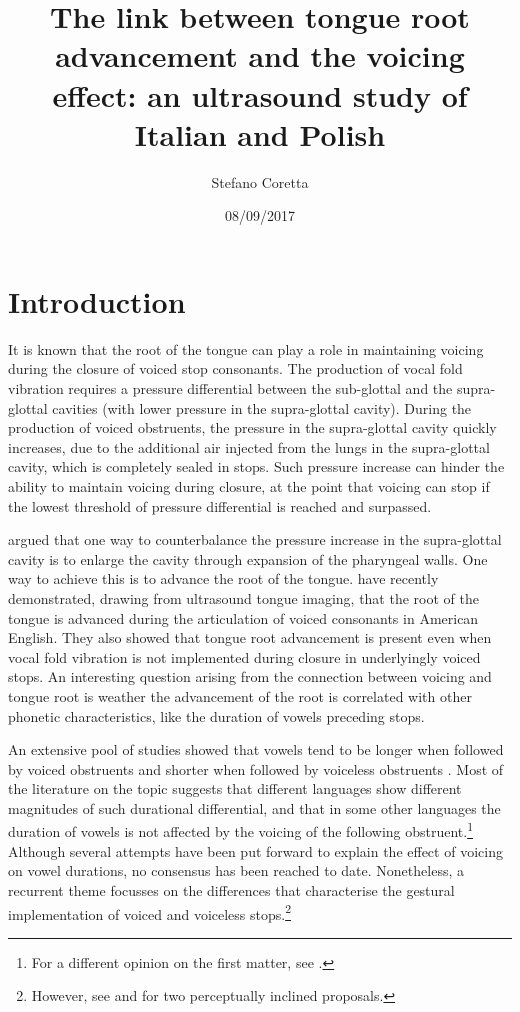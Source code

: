 \documentclass[authoryear, twocolumn]{elsarticle}
\title{The link between tongue root advancement and the voicing effect: an
ultrasound study of Italian and Polish}
\author{Stefano Coretta}
\date{08/09/2017}
\begin{document}
\maketitle

\section{Introduction}\label{introduction}

It is known that the root of the tongue can play a role in maintaining
voicing during the closure of voiced stop consonants. The production of
vocal fold vibration requires a pressure differential between the
sub-glottal and the supra-glottal cavities (with lower pressure in the
supra-glottal cavity). During the production of voiced obstruents, the
pressure in the supra-glottal cavity quickly increases, due to the
additional air injected from the lungs in the supra-glottal cavity,
which is completely sealed in stops. Such pressure increase can hinder
the ability to maintain voicing during closure, at the point that
voicing can stop if the lowest threshold of pressure differential is
reached and surpassed.

\citet{westbury1983} argued that one way to counterbalance the pressure
increase in the supra-glottal cavity is to enlarge the cavity through
expansion of the pharyngeal walls. One way to achieve this is to advance
the root of the tongue. \citet{ahn2016} have recently demonstrated,
drawing from ultrasound tongue imaging, that the root of the tongue is
advanced during the articulation of voiced consonants in American
English. They also showed that tongue root advancement is present even
when vocal fold vibration is not implemented during closure in
underlyingly voiced stops. An interesting question arising from the
connection between voicing and tongue root is weather the advancement of
the root is correlated with other phonetic characteristics, like the
duration of vowels preceding stops.

An extensive pool of studies showed that vowels tend to be longer when
followed by voiced obstruents and shorter when followed by voiceless
obstruents \citep[just to mention a
few]{house1953, chen1970, klatt1973, lisker1973}. Most of the literature
on the topic suggests that different languages show different magnitudes
of such durational differential, and that in some other languages the
duration of vowels is not affected by the voicing of the following
obstruent.\footnote{For a different opinion on the first matter, see \citet{laeufer1992}.}
Although several attempts have been put forward to explain the effect of
voicing on vowel durations, no consensus has been reached to date.
Nonetheless, a recurrent theme focusses on the differences that
characterise the gestural implementation of voiced and voiceless
stops.\footnote{However, see \citep{javkin1976} and \cite{kluender1988} for two perceptually inclined proposals.}
\end{document}
